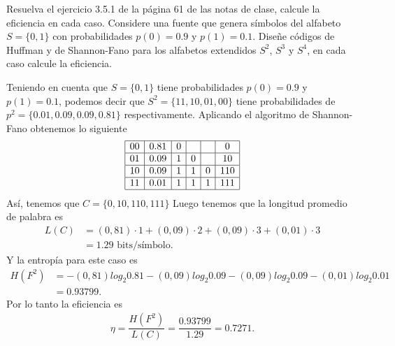 
Resuelva el ejercicio 3.5.1 de la página 61 de las notas de clase, calcule la eficiencia en cada caso. Considere una fuente que genera símbolos del alfabeto $S =\{0, 1\}$ con probabilidades $p(0) = 0.9$ y $p(1) = 0.1$. Diseñe códigos de Huffman y de Shannon-Fano para los alfabetos extendidos $S^2$, $S^{3}$ y $S^{4}$, en cada caso calcule
la eficiencia.

\begin{sol}
Teniendo en cuenta que $S =\{0, 1\}$ tiene probabilidades $p(0) = 0\text{.}9$ y $p(1) = 0\text{.}1$, podemos decir que $S^{2} =\{11 ,10 ,01 ,00\}$ tiene probabilidades de $p^{2}=\{0\text{.}01 , 0\text{.}09 , 0\text{.}09 , 0\text{.}81\}$ respectivamente. Aplicando el algoritmo de Shannon-Fano obtenemos lo siguiente 
\[
\begin{array}{|c|c|c|c|c|c|}
\hline
00 & 0\text{.}81 & 0 & & & 0\\
\hline
01 & 0\text{.}09 & 1 &0 & & 10\\
\hline
10 & 0\text{.}09 & 1 &1 &0 & 110\\
\hline
11 & 0\text{.}01 & 1 &1 &1 & 111\\
\hline
\end{array}
\]
Así, tenemos que $C=\{0, 10, 110, 111\}$ 
Luego tenemos que la longitud promedio de palabra es 
\begin{align*}
    L(C)&=(0,81)\cdot 1+(0,09)\cdot 2+ (0,09)\cdot 3 +(0,01)\cdot 3\\
    &= 1.29 \text{ bits/símbolo}
.\end{align*}
Y la entropía para este caso es
\begin{align*}
    H(F^{2})&=-(0,81)log_2 0.81-(0,09) log_2 0.09 - (0,09)log_2 0.09 -(0,01)log_2 0.01\\
    &= 0.93799
.\end{align*}
Por lo tanto la eficiencia es 
\begin{align*}
    \eta= \dfrac{H(F^{2})}{L(C)}=\dfrac{0.93799}{1.29}=0.7271
.\end{align*}

















\end{sol}
